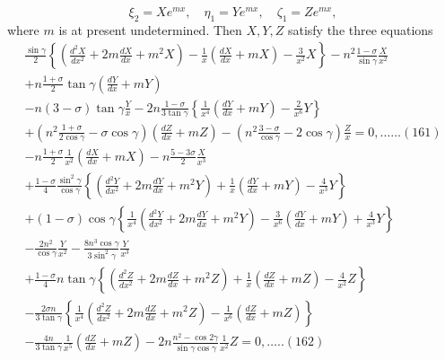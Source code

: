 \[\xi_2=X e^{m x}, \quad \eta_1=Y e^{m x}, \quad \zeta_1=Z e^{m x},\]
where \(m\) is at present undetermined. Then \(X, Y, Z\) satisfy the
three equations
\[
\begin{array}{c}
\frac{\sin \gamma}{2}\left\{\left(\frac{d^2 X}{d x^2}+2 m \frac{d X}{d x}+m^2 X\right)-\frac{1}{x}\left(\frac{d X}{d x}+m X\right)-\frac{3}{x^2} X\right\}
-n^2 \frac{1-\sigma}{\sin \gamma} \frac{X}{x^2} \\
+n \frac{1+\sigma}{2} \tan \gamma\left(\frac{d Y}{d x}+m Y\right)\\
-n(3-\sigma) \tan \gamma \frac{Y}{x}-2 n \frac{1-\sigma}{3 \tan \gamma}\left\{\frac{1}{x^4}\left(\frac{d Y}{d x}+m Y\right)-\frac{2}{x^6} Y\right\} \\
+\left(n^2 \frac{1+\sigma}{2 \cos \gamma}-\sigma \cos \gamma\right)\left(\frac{d Z}{d x}+m Z\right)-\left(n^2 \frac{3-\sigma}{\cos \gamma}-2 \cos \gamma\right) \frac{Z}{x}=0, \ldots \ldots(161) \\
-n \frac{1+\sigma}{2} \frac{1}{x^2}\left(\frac{d X}{d x}+m X\right)-n \frac{5-3 \sigma}{2} \frac{X}{x^3} \\
+\frac{1-\sigma}{4} \frac{\sin ^2 \gamma}{\cos \gamma}\left\{\left(\frac{d^2 Y}{d x^2}+2 m \frac{d Y}{d x}+m^2 Y\right)+\frac{1}{x}\left(\frac{d Y}{d x}+m Y\right)-\frac{4}{x^3} Y\right\} \\
+(1-\sigma) \cos \gamma\left\{\frac{1}{x^4}\left(\frac{d^2 Y}{d x^2}+2 m \frac{d Y}{d x}+m^2 Y\right)-\frac{3}{x^6}\left(\frac{d Y}{d x}+m Y\right)+\frac{4}{x^3} Y\right\} \\
-\frac{2 n^2}{\cos \gamma} \frac{Y}{x^2}-\frac{8 n^3 \cos \gamma}{3 \sin ^2 \gamma} \frac{Y}{x^3} \\
+\frac{1-\sigma}{4} n \tan \gamma\left\{\left(\frac{d^2 Z}{d x^2}+2 m \frac{d Z}{d x}+m^2 Z\right)+\frac{1}{x}\left(\frac{d Z}{d x}+m Z\right)-\frac{4}{x^2} Z\right\} \\
-\frac{2 \sigma n}{3 \tan \gamma}\left\{\frac{1}{x^4}\left(\frac{d^2 Z}{d x^2}+2 m \frac{d Z}{d x}+m^2 Z\right)-\frac{1}{x^6}\left(\frac{d Z}{d x}+m Z\right)\right\}\\
-\frac{4 n}{3 \tan \gamma} \frac{1}{x^5}\left(\frac{d Z}{d x}+m Z\right)
-2 n \frac{n^2-\cos 2 \gamma}{\sin \gamma \cos \gamma} \frac{1}{x^2} Z=0, \ldots . .(162)
\end{array}
\]
